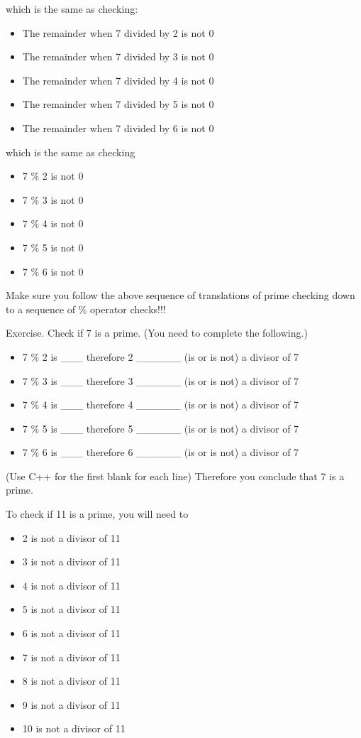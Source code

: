 \documentclass[
]{article}
\providecommand{\tightlist}{%
  \setlength{\itemsep}{0pt}\setlength{\parskip}{0pt}}
\begin{document}
which is the same as checking:

\begin{itemize}
\tightlist
\item
  The remainder when 7 divided by 2 is not 0
\item
  The remainder when 7 divided by 3 is not 0
\item
  The remainder when 7 divided by 4 is not 0
\item
  The remainder when 7 divided by 5 is not 0
\item
  The remainder when 7 divided by 6 is not 0
\end{itemize}

which is the same as checking

\begin{itemize}
\tightlist
\item
  7 \% 2 is not 0
\item
  7 \% 3 is not 0
\item
  7 \% 4 is not 0
\item
  7 \% 5 is not 0
\item
  7 \% 6 is not 0
\end{itemize}

Make sure you follow the above sequence of translations of prime
checking down to a sequence of \% operator checks!!!

Exercise. Check if 7 is a prime. (You need to complete the following.)

\begin{itemize}
\tightlist
\item
  7 \% 2 is \_\_\_ therefore 2 \_\_\_\_\_\_ (is or is not) a divisor of
  7
\item
  7 \% 3 is \_\_\_ therefore 3 \_\_\_\_\_\_ (is or is not) a divisor of
  7
\item
  7 \% 4 is \_\_\_ therefore 4 \_\_\_\_\_\_ (is or is not) a divisor of
  7
\item
  7 \% 5 is \_\_\_ therefore 5 \_\_\_\_\_\_ (is or is not) a divisor of
  7
\item
  7 \% 6 is \_\_\_ therefore 6 \_\_\_\_\_\_ (is or is not) a divisor of
  7
\end{itemize}

(Use C++ for the first blank for each line) Therefore you conclude that
7 is a prime.

To check if 11 is a prime, you will need to

\begin{itemize}
\tightlist
\item
  2 is not a divisor of 11
\item
  3 is not a divisor of 11
\item
  4 is not a divisor of 11
\item
  5 is not a divisor of 11
\item
  6 is not a divisor of 11
\item
  7 is not a divisor of 11
\item
  8 is not a divisor of 11
\item
  9 is not a divisor of 11
\item
  10 is not a divisor of 11
\end{itemize}
\end{document}
